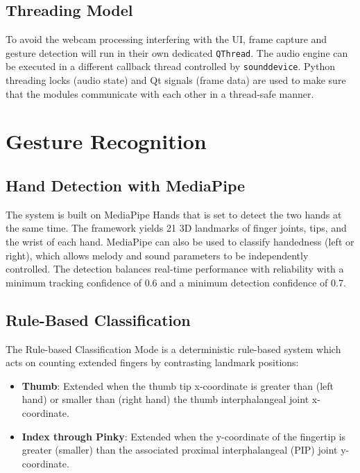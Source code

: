 \documentclass[conference]{IEEEtran}
\begin{document}
\subsection{Threading Model}

To avoid the webcam processing interfering with the UI, frame capture and gesture detection will run in their own dedicated \texttt{QThread}. The audio engine can be executed in a different callback thread controlled by \texttt{sounddevice}. Python threading locks (audio state) and Qt signals (frame data) are used to make sure that the modules communicate with each other in a thread-safe manner.

\section{Gesture Recognition}

\subsection{Hand Detection with MediaPipe}

The system is built on MediaPipe Hands \cite{zhang2020mediapipe} that is set to detect the two hands at the same time. The framework yields 21 3D landmarks of finger joints, tips, and the wrist of each hand. MediaPipe can also be used to classify handedness (left or right), which allows melody and sound parameters to be independently controlled. The detection balances real-time performance with reliability with a minimum tracking confidence of 0.6 and a minimum detection confidence of 0.7.

\subsection{Rule-Based Classification}

The Rule-based Classification Mode is a deterministic rule-based system which acts on counting extended fingers by contrasting landmark positions:

\begin{itemize}
\item \textbf{Thumb}: Extended when the thumb tip x-coordinate is greater than (left hand) or smaller than (right hand) the thumb interphalangeal joint x-coordinate.
\item \textbf{Index through Pinky}: Extended when the y-coordinate of the fingertip is greater (smaller) than the associated proximal interphalangeal (PIP) joint y-coordinate.
\end{itemize}
\end{document}
